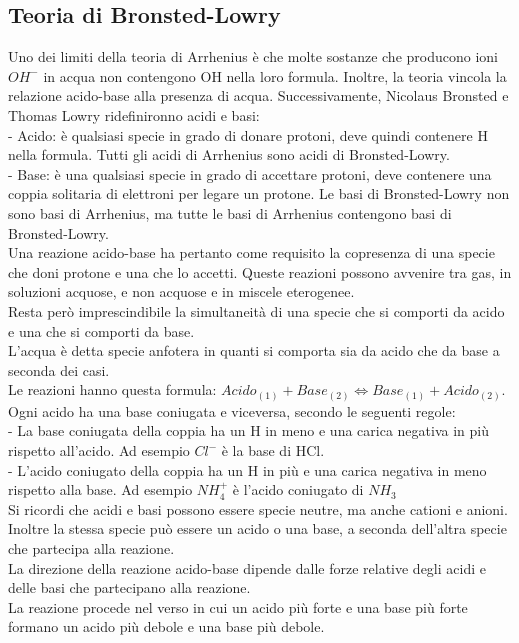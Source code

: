 \subsection{Teoria di Bronsted-Lowry}
Uno dei limiti della teoria di Arrhenius è che molte sostanze che producono ioni $OH^-$ in acqua non contengono OH nella loro formula. Inoltre, la teoria vincola la relazione acido-base alla presenza di acqua. Successivamente, Nicolaus Bronsted e Thomas Lowry ridefinironno acidi e basi:\\
\tab- Acido: è qualsiasi specie in grado di donare protoni, deve quindi contenere H nella formula. Tutti gli acidi di Arrhenius sono acidi di Bronsted-Lowry.\\
\tab- Base: è una qualsiasi specie in grado di accettare protoni, deve contenere una coppia solitaria di elettroni per legare un protone. Le basi di Bronsted-Lowry non sono basi di Arrhenius, ma tutte le basi di Arrhenius contengono basi di Bronsted-Lowry.\\
Una reazione acido-base ha pertanto come requisito la copresenza di una specie che doni protone e una che lo accetti. Queste reazioni possono avvenire tra gas, in soluzioni acquose, e non acquose e in miscele eterogenee.\\
Resta però imprescindibile la simultaneità di una specie che si comporti da acido e una che si comporti da base.\\
L'acqua è detta specie anfotera in quanti si comporta sia da acido che da base a seconda dei casi.\\
Le reazioni hanno questa formula: $Acido_{(1)} + Base_{(2)} \Leftrightarrow Base_{(1)} + Acido_{(2)}$. Ogni acido ha una base coniugata e viceversa, secondo le seguenti regole:\\
\tab- La base coniugata della coppia ha un H in meno e una carica negativa in più rispetto all'acido. Ad esempio $Cl^-$ è la base di HCl.\\
\tab- L'acido coniugato della coppia ha un H in più e una carica negativa in meno rispetto alla base. Ad esempio $NH_4^+$ è l'acido coniugato di $NH_3$\\
Si ricordi che acidi e basi possono essere specie neutre, ma anche cationi e anioni. Inoltre la stessa specie può essere un acido o una base, a seconda dell'altra specie che partecipa alla reazione.\\
La direzione della reazione acido-base dipende dalle forze relative degli acidi e delle basi che partecipano alla reazione.\\
La reazione procede nel verso in cui un acido più forte e una base più forte formano un acido più debole e una base più debole.\\
